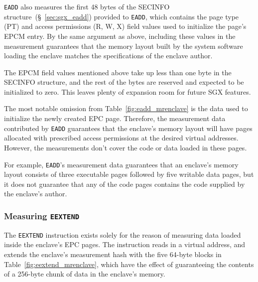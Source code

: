 \texttt{EADD} also measures the first 48 bytes of the SECINFO
structure~(\S~\ref{sec:sgx_eadd}) provided to \texttt{EADD}, which contains the
page type (PT) and access permissions (R, W, X) field values used to initialize
the page's EPCM entry. By the same argument as above, including these values in
the measurement guarantees that the memory layout built by the system software
loading the enclave matches the specifications of the enclave author.

The EPCM field values mentioned above take up less than one byte in the SECINFO
structure, and the rest of the bytes are reserved and expected to be
initialized to zero. This leaves plenty of expansion room for future SGX
features.

The most notable omission from Table~\ref{fig:eadd_mrenclave} is the data used
to initialize the newly created EPC page. Therefore, the measurement data
contributed by \texttt{EADD} guarantees that the enclave's memory layout
will have pages allocated with prescribed access permissions at the desired
virtual addresses. However, the measurements don't cover the code or data
loaded in these pages.

For example, \texttt{EADD}'s measurement data guarantees that an enclave's
memory layout consists of three executable pages followed by five writable data
pages, but it does not guarantee that any of the code pages contains the
code supplied by the enclave's author.


\subsubsection{Measuring \texttt{EEXTEND}}
\label{sec:sgx_eextend}


The \texttt{EEXTEND} instruction exists solely for the reason of measuring data
loaded inside the enclave's EPC pages. The instruction reads in a virtual
address, and extends the enclave's measurement hash with the five 64-byte
blocks in Table~\ref{fig:eextend_mrenclave}, which have the effect of
guaranteeing the contents of a 256-byte chunk of data in the enclave's memory.

